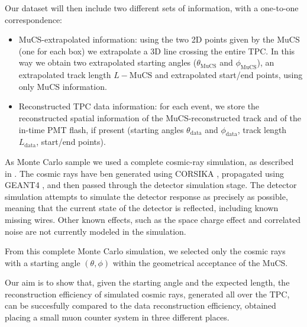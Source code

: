 \documentclass[a4paper]{scrartcl}
\begin{document}
Our dataset will then include two different sets of information, with a one-to-one correspondence:
\begin{itemize}
\item MuCS-extrapolated information: using the two 2D points given by the MuCS (one for each box) we extrapolate a 3D line crossing the entire TPC. In this way we obtain two extrapolated starting angles ($\theta_{\textrm{MuCS}}$ and $\phi_{\textrm{MuCS}}$), an extrapolated track length $L-{\textrm{MuCS}}$ and extrapolated start/end points, using only MuCS information.
\item Reconstructed TPC data information: for each event, we store the reconstructed spatial information of the MuCS-reconstructed track and of the in-time PMT flash, if present (starting angles $\theta_{\textrm{data}}$ and $\phi_{\textrm{data}}$, track length $L_{\textrm{data}}$, start/end points).
\end{itemize}


As Monte Carlo sample we used a complete cosmic-ray simulation, as described in \cite{mcdata}. The cosmic rays have ben generated using CORSIKA \cite{corsika},  propagated using GEANT4 \cite{geant}, and then passed through the detector simulation stage. The detector simulation attempts to simulate the detector response as precisely as possible, meaning that the current state of the detector is reflected, including known missing wires. Other known effects, such as the space charge effect \cite{spacecharge} and correlated noise \cite{noise} are not currently modeled in the simulation.

From this complete Monte Carlo simulation, we selected only the cosmic rays with a starting angle $(\theta,\phi)$ within the geometrical acceptance of the MuCS.

Our aim is to show that, given the starting angle and the expected length, the reconstruction efficiency of simulated cosmic rays, generated all over the TPC, can be succesfully compared to the data reconstruction efficiency, obtained placing a small muon counter system in three different places. 
\end{document}
